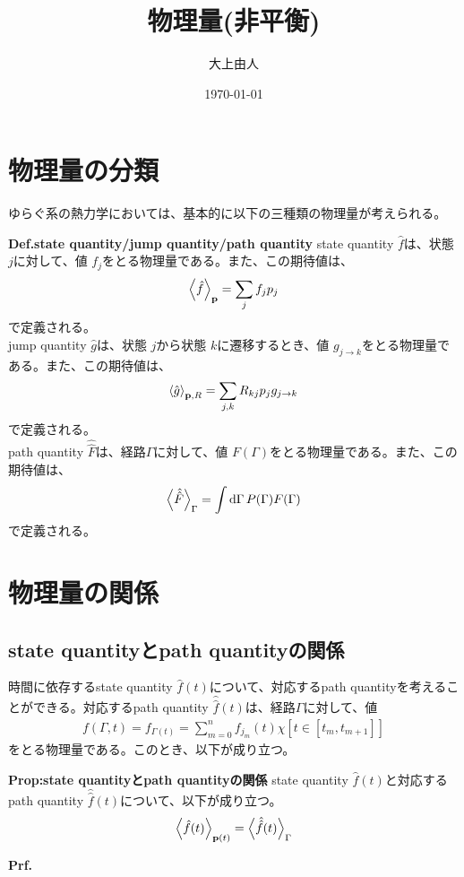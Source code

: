 \documentclass[a4paper,11pt]{jsarticle}
\numberwithin{equation}{section}
\begin{document}
\title{物理量(非平衡)}
\author{大上由人}
\date{\today}
\maketitle

\section{物理量の分類}
ゆらぐ系の熱力学においては、基本的に以下の三種類の物理量が考えられる。\\
\begin{itembox}[l]{\textbf{Def.state quantity/jump quantity/path quantity}}
    state quantity $\hat{f}$は、状態 $j$に対して、値 $f_j$をとる物理量である。また、この期待値は、
    \begin{align}
        \ev{\hat{f}}_{\vb{p}} = \sum_{j} f_j p_j
    \end{align}
    で定義される。\\

    jump quantity $\hat{g}$は、状態 $j$から状態 $k$に遷移するとき、値 $g_{j\to k}$をとる物理量である。また、この期待値は、
    \begin{align}
        \ev{\hat{g}}_{\vb{p},R} = \sum_{j,k} R_{kj} p_j g_{j\to k}
    \end{align}
    で定義される。\\

    path quantity $\hat{\hat{F}}$は、経路$\Gamma$に対して、値 $F({\Gamma})$をとる物理量である。また、この期待値は、
    \begin{align}
        \ev{\hat{\hat{F}}}_{\Gamma} = \int \dd{\Gamma} P(\Gamma) F(\Gamma)
    \end{align}
    で定義される。
\end{itembox}

\section{物理量の関係}
\subsection{state quantityとpath quantityの関係}
時間に依存するstate quantity $\hat{f}(t)$について、対応するpath quantityを考えることができる。対応するpath quantity $\hat{\hat{f}}(t)$は、経路$\Gamma$に対して、値
\begin{align}
    f(\Gamma,t) = f_{\Gamma(t)} = \sum_{m=0}^{n} f_{j_{m}}(t) \chi[t \in [t_{m},t_{m+1}]]
\end{align}
をとる物理量である。このとき、以下が成り立つ。
\begin{itembox}[l]{\textbf{Prop:state quantityとpath quantityの関係}}
    state quantity $\hat{f}(t)$と対応するpath quantity $\hat{\hat{f}}(t)$について、以下が成り立つ。
    \begin{align}
        \ev{\hat{f}(t)}_{\vb{p}(t)} = \ev{\hat{\hat{f}}(t)}_{\Gamma}
    \end{align}
\end{itembox}
\textbf{Prf.}\\
\end{document}
